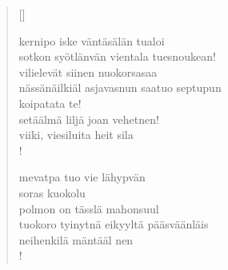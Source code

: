 \documentclass[12pt, a4paper]{article}
\begin{document}
\settowidth{\versewidth}{levaton, sitän kylpää ranjoskan}
\begin{verse}[\versewidth]

kernipo iske väntäsälän tualoi \\
sotkon syötlänvän vientala tuesnoukean! \\
vilielevät siinen nuokorsasaa \\
nässänäilkiäl asjavasnun saatuo septupun \\
koipatata te! \\
setäälmä liljä joan vehetnen! \\
viiki, viesiluita heit sila \\!



mevatpa tuo vie lähypvän \\
soras kuokolu \\
polmon on tässlä mahonsuul \\
tuokoro tyinytnä eikyyltä pääsväänläis \\
neihenkilä mäntääl nen \\!


\end{verse}
\newpage
\end{document}
